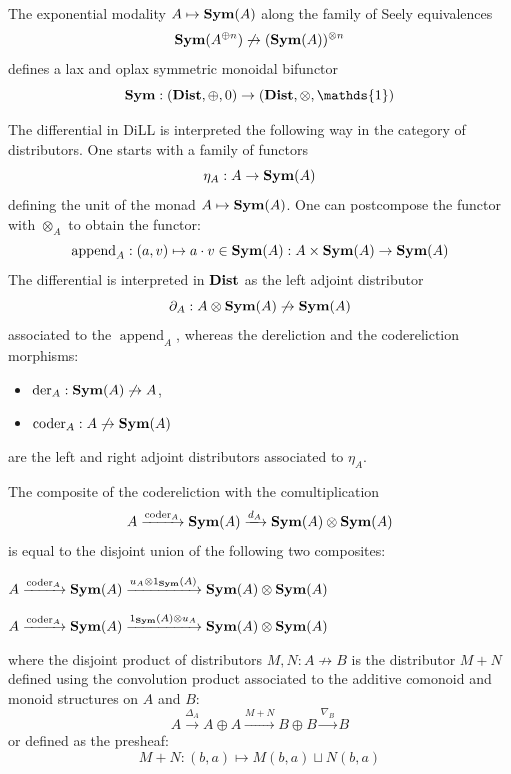 \documentclass[8pt]{article}
\theoremstyle{definition}
\theoremstyle{definition}
\theoremstyle{definition}
\theoremstyle{definition}
\theoremstyle{definition}
\theoremstyle{definition}
\theoremstyle{definition}
\theoremstyle{definition}
\theoremstyle{definition}
\theoremstyle{definition}
\theoremstyle{definition}
\theoremstyle{definition}
\theoremstyle{definition}
\theoremstyle{definition}
\theoremstyle{question}
\begin{document}
The exponential modality $A \mapsto {\bf Sym}(A)$ along the family of Seely equivalences
\[
{\bf Sym}(A^{\oplus n}) \not\to ({\bf Sym}(A))^{\otimes n}
\]
defines a lax and oplax symmetric monoidal bifunctor
\[
{\bf Sym} : ({\bf Dist}, \oplus, 0) \to ({\bf Dist}, \otimes, \mathds{1})
\]

The differential in DiLL is interpreted the following way in the category of distributors. One starts with a family of functors
\[
\eta_A : A \to {\bf Sym}(A)
\]
defining the unit of the monad $A \mapsto {\bf Sym}(A)$. One can postcompose the functor with $\otimes_A$ to obtain the functor:
\[
\operatorname{append}_A : (a, v) \mapsto a \cdot v \in {\bf Sym}(A) : A \times {\bf Sym}(A) \to {\bf Sym}(A)
\]
The differential is interpreted in ${\bf Dist}$ as the left adjoint distributor
\[
\partial_A : A \otimes {\bf Sym}(A) \not\to {\bf Sym}(A)
\]
associated to the $\operatorname{append}_A$, whereas the dereliction and the codereliction morphisms:
\begin{itemize}
  \item $\operatorname{der}_A : {\bf Sym}(A) \not\to A$,
  \item $\operatorname{coder}_A : A \not\to {\bf Sym}(A)$
\end{itemize}
are the left and right adjoint distributors associated to $\eta_A$.

The composite of the codereliction with the comultiplication
\[
A \xrightarrow{\operatorname{coder}_A } {\bf Sym}(A) \xrightarrow{d_A} {\bf Sym}(A) \otimes {\bf Sym}(A)
\]
is equal to the disjoint union of the following two composites:
\begin{center}
  $A \xrightarrow{\operatorname{coder}_A } {\bf Sym}(A) \xrightarrow{u_A \otimes 1_{\bf Sym}(A)} {\bf Sym}(A) \otimes {\bf Sym}(A)$

  $A \xrightarrow{\operatorname{coder}_A } {\bf Sym}(A) \xrightarrow{1_{\bf Sym}(A) \otimes u_A}{\bf Sym}(A) \otimes {\bf Sym}(A)$
\end{center}
where the disjoint product of distributors $M, N : A \not\to B$ is the distributor $M + N$ defined using the convolution product
associated to the additive comonoid and monoid structures on $A$ and $B$:
\[
A \xrightarrow{\Delta_A} A \oplus A \xrightarrow{M + N} B \oplus B \xrightarrow{\nabla_B} B
\]
or defined as the presheaf:
\[
M + N : (b,a) \mapsto M(b,a) \sqcup N(b,a)
\]
\end{document}
